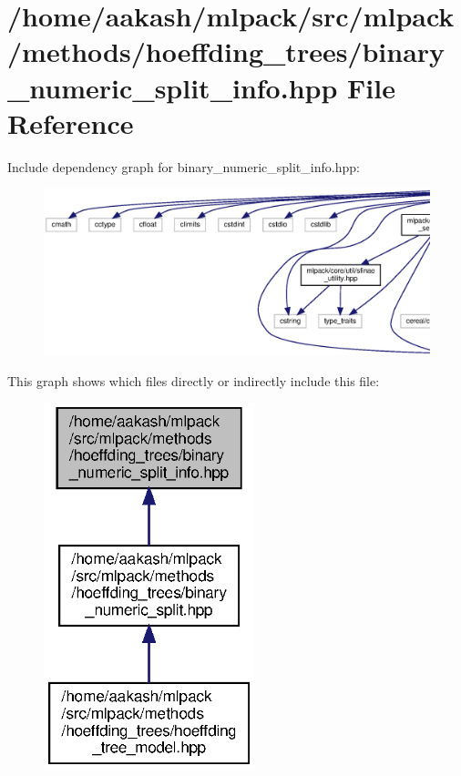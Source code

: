 \section{/home/aakash/mlpack/src/mlpack/methods/hoeffding\+\_\+trees/binary\+\_\+numeric\+\_\+split\+\_\+info.hpp File Reference}
\label{binary__numeric__split__info_8hpp}
Include dependency graph for binary\+\_\+numeric\+\_\+split\+\_\+info.\+hpp\+:
\nopagebreak
\begin{figure}[H]
\begin{center}
\leavevmode
\includegraphics[width=350pt]{binary__numeric__split__info_8hpp__incl}
\end{center}
\end{figure}
This graph shows which files directly or indirectly include this file\+:
\nopagebreak
\begin{figure}[H]
\begin{center}
\leavevmode
\includegraphics[width=173pt]{binary__numeric__split__info_8hpp__dep__incl}
\end{center}
\end{figure}
